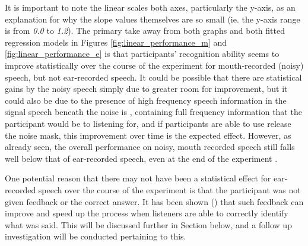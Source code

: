 It is important to note the linear scales both \DIFaddbegin {}\DIFaddend axes, particularly the y-axis, as an explanation for why the slope values themselves are so small (ie. the y-axis range is from \textit{0.0} to \textit{1.2}).  The primary take away from both graphs and both fitted regression models in Figures \ref{fig:linear_performance_m} and \ref{fig:linear_performance_e} is that participants' recognition ability seems to improve statistically over the course of the experiment for mouth-recorded (noisy) speech, but not ear-recorded speech.  It could be possible that there are statistical gains by the noisy speech simply due to greater room for improvement, but it could also be due to the presence of high frequency speech information in the signal \DIFdelbegin {}\DIFdelend \DIFaddbegin {}\DIFaddend speech beneath the noise is \DIFdelbegin {}\DIFdelend \DIFaddbegin {}\DIFaddend , containing full frequency information that the participant would be \DIFdelbegin {}\DIFdelend \DIFaddbegin {}\DIFaddend to listening for, and if participants are able to use \DIFdelbegin {}\DIFdelend \DIFaddbegin {}\DIFaddend release the noise mask, this improvement over time is the expected effect.  However, as already seen, the overall performance on noisy, mouth recorded speech still falls well below that of ear-recorded speech, even at the \DIFaddbegin {}\DIFaddend end of the experiment \DIFaddbegin {}\DIFaddend .

One potential reason that there may not have been a statistical \DIFdelbegin {}\DIFdelend \DIFaddbegin {}\DIFaddend effect for ear-recorded speech over the course of the experiment is that the participant was not given feedback or the correct answer.  It has been shown (\cite{davis:05}) that such feedback can improve and speed up the \DIFdelbegin {}\DIFdelend \DIFaddbegin {}\DIFaddend process when listeners are able to correctly identify what was said.  This will be discussed further in Section \DIFdelbegin \DIFdel{\ref{ch4:follow-up-expts} }\DIFdelend \DIFaddbegin \DIFadd{\ref{chap3:follow-up-expts} }\DIFaddend below, and a follow up investigation will be conducted pertaining to this.


